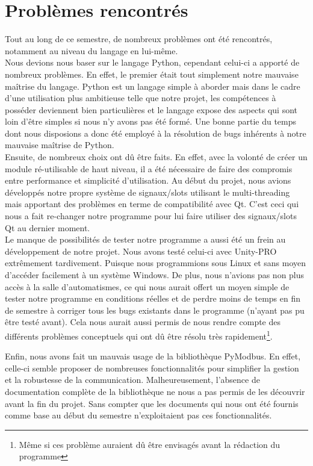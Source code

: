 \section{Problèmes rencontrés}

Tout au long de ce semestre, de nombreux problèmes ont été rencontrés, notamment au niveau du langage en lui-même. \\
Nous devions nous baser sur le langage Python, cependant celui-ci a apporté de nombreux problèmes.
\newline
En effet, le premier était tout simplement notre mauvaise maîtrise du langage. Python est un langage simple à aborder mais dans le cadre d'une utilisation plus ambitieuse telle que notre projet, les compétences à posséder deviennent bien particulières et le langage expose des aspects qui sont loin d'être simples si nous n'y avons pas été formé. \newline
Une bonne partie du temps dont nous disposions a donc été employé à la résolution de bugs inhérents à notre mauvaise maîtrise de Python.\\



Ensuite, de nombreux choix ont dû être faits. En effet, avec la volonté de créer un module ré-utilisable de haut niveau, il a été nécessaire de faire des compromis entre performance et simplicité d'utilisation.\newline
Au début du projet, nous avions développés notre propre système de signaux/slots utilisant le multi-threading mais apportant des problèmes en terme de compatibilité avec Qt. C'est ceci qui nous a fait re-changer notre programme pour lui faire utiliser des signaux/slots Qt au dernier moment.\\



Le manque de possibilités de tester notre programme a aussi été un frein au développement de notre projet. Nous avons testé celui-ci avec Unity-PRO extrêmement tardivement.\newline
Puisque nous programmions sous Linux et sans moyen d'accéder facilement à un système Windows.\newline
De plus, nous n'avions pas non plus accès à la salle d'automatismes, ce qui nous aurait offert un moyen simple de tester notre programme en conditions réelles et de perdre moins de temps en fin de semestre à corriger tous les bugs existants dans le programme (n'ayant pas pu être testé avant). Cela nous aurait aussi permis de nous rendre compte des différents problèmes conceptuels qui ont dû être résolu très rapidement\footnote{Même si ces problème auraient dû être envisagés avant la rédaction du programme}.


Enfin, nous avons fait un mauvais usage de la bibliothèque PyModbus. En effet, celle-ci semble proposer de nombreuses fonctionnalités pour simplifier la gestion et la robustesse de la communication. Malheureusement, l'absence de documentation complète de la bibliothèque ne nous a pas permis de les découvrir avant la fin du projet. Sans compter que les documents qui nous ont été fournis comme base au début du semestre n'exploitaient pas ces fonctionnalités.

